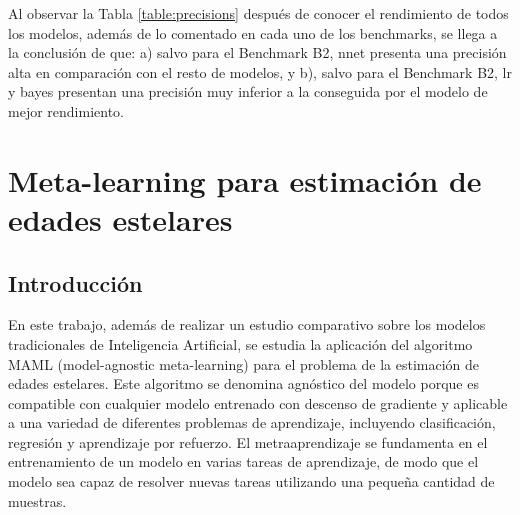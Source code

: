 Al observar la Tabla \ref{table:precisions} después de conocer el rendimiento de todos los modelos, además de lo comentado en cada uno de los benchmarks, se llega a la conclusión de que: a) salvo para el Benchmark B2, nnet presenta una precisión alta en comparación con el resto de modelos, y b), salvo para el Benchmark B2, lr y bayes presentan una precisión muy inferior a la conseguida por el modelo de mejor rendimiento.

\begin{table}[H]
\centering
{}%
\caption{Precisión de todos los métodos en los diferentes benchmarks. La precisión se mide como el porcentaje de estimaciones de edad que caen dentro del margen de confianza asociado a cada estrella.}\label{table:precisions}
\end{table}


\chapter{Meta-learning para estimación de edades estelares}
 
\section{Introducción}

En este trabajo, además de realizar un estudio comparativo sobre los modelos tradicionales de Inteligencia Artificial, se estudia la aplicación del algoritmo MAML (model-agnostic meta-learning) para el problema de la estimación de edades estelares. Este algoritmo se denomina agnóstico del modelo porque es compatible con cualquier modelo entrenado con descenso de gradiente y aplicable a una variedad de diferentes problemas de aprendizaje, incluyendo clasificación, regresión y aprendizaje por refuerzo. El metraaprendizaje se fundamenta en el entrenamiento de un modelo en varias tareas de aprendizaje, de modo que el modelo sea capaz de resolver nuevas tareas utilizando una pequeña cantidad de muestras.

